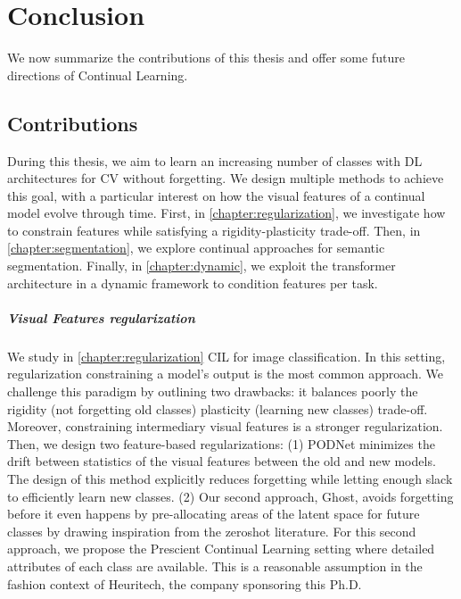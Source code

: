 \chapter{Conclusion}
\label{chapter:conclusion}

{}


We now summarize the contributions of this thesis and offer some future directions of Continual
Learning.

\section{Contributions}

During this thesis, we aim to learn an increasing number of classes with \ac{DL} architectures for
\ac{CV} without forgetting. We design multiple methods to achieve this goal, with a particular
interest on how the visual features of a continual model evolve through time. First, in
\autoref{chapter:regularization}, we investigate how to constrain features while satisfying a
rigidity-plasticity trade-off. Then, in \autoref{chapter:segmentation}, we explore continual
approaches for semantic segmentation. Finally, in \autoref{chapter:dynamic}, we exploit the
transformer architecture in a dynamic framework to condition features per task.

\paragraph{Visual Features regularization} We study in \autoref{chapter:regularization} \ac{CIL} for
image classification. In this setting, regularization constraining a model's output is the most
common approach. We challenge this paradigm by outlining two drawbacks: it balances poorly the
rigidity (not forgetting old classes) \vs plasticity (learning new classes) trade-off. Moreover,
constraining intermediary visual features is a stronger regularization. Then, we design two
feature-based regularizations: (1) PODNet minimizes the drift between statistics of the visual
features between the old and new models. The design of this method explicitly reduces forgetting
while letting enough slack to efficiently learn new classes. (2) Our second approach, Ghost, avoids
forgetting before it even happens by pre-allocating areas of the latent space for future classes by
drawing inspiration from the zeroshot literature. For this second approach, we propose the Prescient
Continual Learning setting where detailed attributes of each class are available. This is a
reasonable assumption in the fashion context of Heuritech, the company sponsoring this Ph.D.

